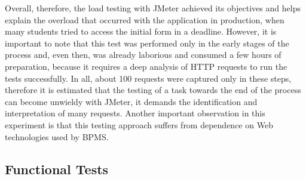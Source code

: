 \documentclass[runningheads,a4paper]{llncs}
\begin{document}
{%

Overall, therefore, the load testing with JMeter achieved its objectives and helps explain the overload that occurred with the application in production, when many students tried to access the initial form in a deadline. However, it is important to note that this test was performed only in the early stages of the process and, even then, was already laborious and consumed a few hours of preparation, because it requires a deep analysis of HTTP requests to run the tests successfully. In all, about 100 requests were captured only in these steps, therefore it is estimated that the testing of a task towards the end of the process can become unwieldy with JMeter, it demands the identification and interpretation of many requests. Another important observation in this experiment is that this testing approach suffers from dependence on Web technologies used by BPMS.

\subsection{Functional Tests}


}
\end{document}
